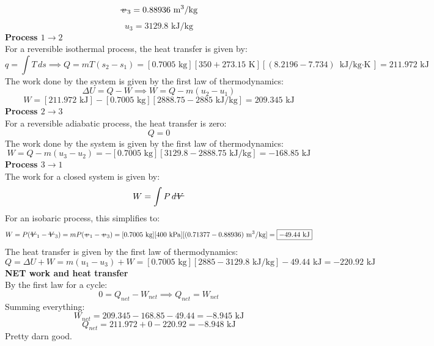 \documentclass[12pt]{article}
\newcommand{\vol}{\mathord{\text{\ooalign{\hidewidth $V$\hidewidth\cr\kern-0.5pt\raisebox{0.8ex}{\rule[0pt]{1em}{0.5pt}}}}}}
\newcommand{\svol}{%
  \mathord{\text{\ooalign{%
    \hfil$v$\hfil\cr
    \hfil\rule[0.6ex]{0.8em}{0.5pt}\hfil
  }}}%
}
\begin{document}
\[\svol_3 =0.88936\text{ m$^3$/kg}\]
\[u_3 = 3129.8 \text{ kJ/kg}\]
\textbf{Process $1\to2$}\\
For a reversible isothermal process, the heat transfer is given by:
\[q = \int T\,ds \implies Q = mT(s_2 - s_1)= [0.7005\text{ kg}][350 + 273.15\text{ K}][(8.2196 - 7.734)\text{ kJ/kg$\cdot$K}] = \boxed{211.972\text{ kJ}}\]
The work done by the system is given by the first law of thermodynamics:
\[\Delta U = Q - W \implies W = Q - m(u_2 - u_1)\]
\[W= [211.972\text{ kJ}] - [0.7005\text{ kg}][2888.75 - 2885\text{ kJ/kg}] = \boxed{209.345\text{ kJ}}\]
\textbf{Process $2\to3$}\\
For a reversible adiabatic process, the heat transfer is zero:
\[\boxed{Q = 0}\]
The work done by the system is given by the first law of thermodynamics:
\[W = Q - m(u_3 - u_2) = -[0.7005\text{ kg}][3129.8 - 2888.75\text{ kJ/kg}] = \boxed{-168.85\text{ kJ}}\]
\textbf{Process $3\to1$}\\
The work for a closed system is given by:
\[W = \int P\,d\vol\]
For an isobaric process, this simplifies to:
\[W = P(\vol_1 - \vol_3) = mP(\svol_1 - \svol_3) = [0.7005\text{ kg}][400\text{ kPa}][(0.71377 - 0.88936)\text{ m$^3$/kg}] = \boxed{-49.44\text{ kJ}}\]
The heat transfer is given by the first law of thermodynamics:
\[Q = \Delta U + W = m(u_1 - u_3) + W = [0.7005\text{ kg}][2885 - 3129.8\text{ kJ/kg}] - 49.44\text{ kJ} = \boxed{-220.92\text{ kJ}}\]
\textbf{NET work and heat transfer}\\
By the first law for a cycle:
\[0 = Q_{net} - W_{net} \implies Q_{net} = W_{net}\]
Summing everything:
\[W_{net} = 209.345 - 168.85 - 49.44 = \boxed{-8.945\text{ kJ}}\]
\[Q_{net} = 211.972 + 0 - 220.92 = \boxed{-8.948\text{ kJ}}\]
Pretty darn good.
\end{document}
